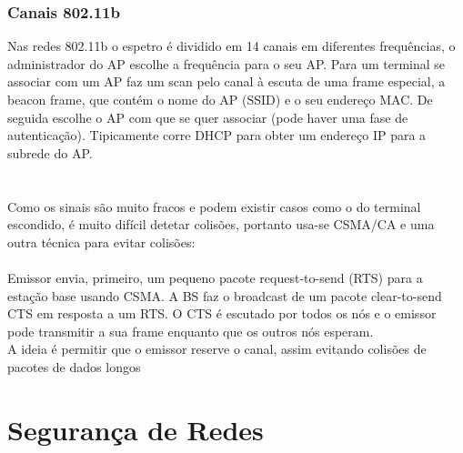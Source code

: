 \documentclass[10pt,a4paper]{report}
\begin{document}
\subsubsection{Canais 802.11b}
Nas redes 802.11b o espetro é dividido em 14 canais em diferentes frequências, o administrador do AP escolhe a frequência para o seu AP. Para um terminal se associar com um AP faz um scan pelo canal à escuta de uma frame especial, a beacon frame, que contém o nome do AP (SSID) e o seu endereço MAC. De seguida escolhe o AP com que se quer associar (pode haver uma fase de autenticação). Tipicamente corre DHCP para obter um endereço IP para a subrede do AP.\\
\\
\\
Como os sinais são muito fracos e podem existir casos como o do terminal escondido, é muito difícil detetar colisões, portanto usa-se CSMA/CA e uma outra técnica para evitar colisões:\\
\\
Emissor envia, primeiro, um pequeno pacote request-to-send (RTS) para a estação base usando CSMA. A BS faz o broadcast de um pacote clear-to-send CTS em resposta a um RTS. O CTS é escutado por todos os nós e o emissor pode transmitir a sua frame enquanto que os outros nós esperam.\\
A ideia é permitir que o emissor reserve o canal, assim evitando colisões de pacotes de dados longos

\section{Segurança de Redes}
\end{document}
